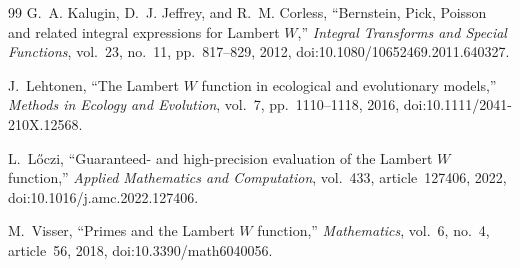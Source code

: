 \documentclass[11pt]{article}
\theoremstyle{remark}
\begin{document}
\begin{thebibliography}{99}
G.~A. Kalugin, D.~J. Jeffrey, and R.~M. Corless,
``Bernstein, Pick, Poisson and related integral expressions for Lambert
\(W\),''
\emph{Integral Transforms and Special Functions}, vol.~23, no.~11,
pp.~817--829, 2012, doi:10.1080/10652469.2011.640327.

J.~Lehtonen,
``The Lambert \(W\) function in ecological and evolutionary models,''
\emph{Methods in Ecology and Evolution}, vol.~7, pp.~1110--1118, 2016,
doi:10.1111/2041-210X.12568.

L.~L\H{o}czi,
``Guaranteed- and high-precision evaluation of the Lambert \(W\) function,''
\emph{Applied Mathematics and Computation}, vol.~433, article~127406, 2022,
doi:10.1016/j.amc.2022.127406.

M.~Visser,
``Primes and the Lambert \(W\) function,''
\emph{Mathematics}, vol.~6, no.~4, article~56, 2018,
doi:10.3390/math6040056.

\end{thebibliography}
\end{document}
